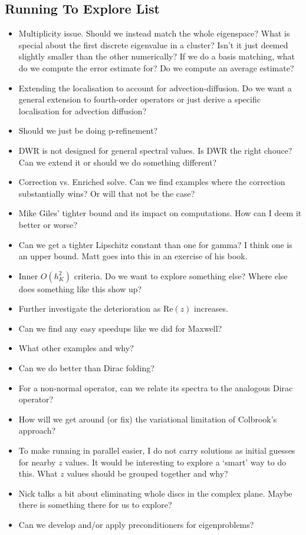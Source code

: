 \documentclass[12pt,a4paper]{article}
\begin{document}
\subsection{Running To Explore List}

\begin{itemize}
    \item Multiplicity issue. Should we instead match the whole eigenspace? What is special about the first discrete eigenvalue in a cluster? Isn't it just deemed slightly smaller than the other numerically? If we do a basis matching, what do we compute the error estimate for? Do we compute an average estimate? 
    \item Extending the localisation to account for advection-diffusion. Do we want a general extension to fourth-order operators or just derive a specific localisation for advection diffusion?
    \item Should we just be doing p-refinement? 
    \item DWR is not designed for general spectral values. Is DWR the right chouce? Can we extend it or should we do something different?
    \item Correction vs. Enriched solve. Can we find examples where the correction substantially wins? Or will that not be the case?
    \item Mike Giles' tighter bound and its impact on computations. How can I deem it better or worse? 
    \item Can we get a tighter Lipschitz constant than one for gamma? I think one is an upper bound. Matt goes into this in an exercise of his book. 
    \item Inner $O(h_K^2)$ criteria. Do we want to explore something else? Where else does something like this show up? 
    \item Further investigate the deterioration as $\text{Re}(z)$ increases. 
    \item Can we find any easy speedups like we did for Maxwell? 
    \item What other examples and why? 
    \item Can we do better than Dirac folding?
    \item For a non-normal operator, can we relate its spectra to the analogous Dirac operator? 
    \item How will we get around (or fix) the variational limitation of Colbrook's approach? 
    \item To make running in parallel easier, I do not carry solutions as initial guesses for nearby $z$ values. It would be interesting to explore a `smart' way to do this. What $z$ values should be grouped together and why? 
    \item Nick talks a bit about eliminating whole discs in the complex plane. Maybe there is something there for us to explore? 
    \item Can we develop and/or apply preconditioners for eigenproblems? 
\end{itemize}
\end{document}
